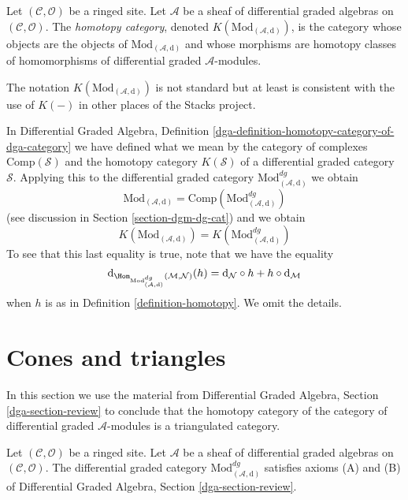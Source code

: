 \begin{definition}
\label{definition-complexes-notation}
Let $(\mathcal{C}, \mathcal{O})$ be a ringed site.
Let $\mathcal{A}$ be a sheaf of differential graded algebras
on $(\mathcal{C}, \mathcal{O})$.
The {\it homotopy category}, denoted $K(\text{Mod}_{(\mathcal{A}, \text{d})})$,
is the category whose objects are the objects of
$\text{Mod}_{(\mathcal{A}, \text{d})}$ and whose morphisms are homotopy classes
of homomorphisms of differential graded $\mathcal{A}$-modules.
\end{definition}

\noindent
The notation $K(\text{Mod}_{(\mathcal{A}, \text{d})})$
is not standard but at least is
consistent with the use of $K(-)$ in other places of the Stacks project.

\medskip\noindent
In Differential Graded Algebra, Definition
\ref{dga-definition-homotopy-category-of-dga-category}
we have defined what we mean by the category of complexes
$\text{Comp}(\mathcal{S})$
and the homotopy category $K(\mathcal{S})$
of a differential graded category $\mathcal{S}$.
Applying this to the differential graded category
$\text{Mod}^{dg}_{(\mathcal{A}, \text{d})}$ we obtain
$$
\text{Mod}_{(\mathcal{A}, \text{d})} =
\text{Comp}(\text{Mod}^{dg}_{(\mathcal{A}, \text{d})})
$$
(see discussion in Section \ref{section-dgm-dg-cat}) and we obtain
$$
K(\text{Mod}_{(\mathcal{A}, \text{d})}) =
K(\text{Mod}^{dg}_{(\mathcal{A}, \text{d})})
$$
To see that this last equality is true, note that we have the equality
$$
\text{d}_{\Hom_{\text{Mod}^{dg}_{(\mathcal{A}, \text{d})}}
(\mathcal{M}, \mathcal{N})}(h) =
\text{d}_\mathcal{N} \circ h + h \circ \text{d}_\mathcal{M}
$$
when $h$ is as in Definition \ref{definition-homotopy}. We omit the
details.











\section{Cones and triangles}
\label{section-conclude-triangulated}

\noindent
In this section we use the material from
Differential Graded Algebra, Section \ref{dga-section-review}
to conclude that the homotopy category of the
category of differential graded $\mathcal{A}$-modules
is a triangulated category.

\begin{lemma}
\label{lemma-axioms-AB}
Let $(\mathcal{C}, \mathcal{O})$ be a ringed site.
Let $\mathcal{A}$ be a sheaf of differential graded algebras
on $(\mathcal{C}, \mathcal{O})$.
The differential graded category
$\text{Mod}^{dg}_{(\mathcal{A}, \text{d})}$
satisfies axioms (A) and (B) of
Differential Graded Algebra, Section \ref{dga-section-review}.
\end{lemma}

